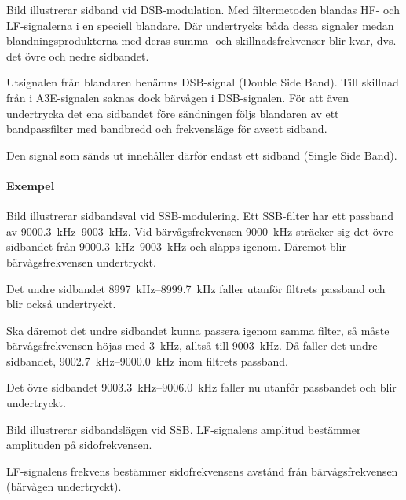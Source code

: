 Bild  illustrerar sidband vid DSB-modulation.
Med filtermetoden blandas HF- och LF-signalerna i en speciell blandare.
Där undertrycks båda dessa signaler medan blandningsprodukterna med deras summa-
och skillnadsfrekvenser blir kvar, dvs. det övre och nedre sidbandet.

Utsignalen från blandaren benämns DSB-signal (Double Side Band).
Till skillnad från i A3E-signalen saknas dock bärvågen i DSB-signalen.
För att även undertrycka det ena sidbandet före sändningen följs blandaren
av ett bandpassfilter med bandbredd och frekvensläge för avsett sidband.

Den signal som sänds ut innehåller därför endast ett sidband (Single Side Band).

\newpage

\paragraph{Exempel}


Bild  illustrerar sidbandsval vid SSB-modulering.
Ett SSB-filter har ett passband av \SIrange{9000,3}{9003}{\kilo\hertz}.
Vid bärvågsfrekvensen \qty{9000}{\kilo\hertz} sträcker sig det övre sidbandet
från \SIrange{9000,3}{9003}{\kilo\hertz} och släpps igenom.
Däremot blir bärvågsfrekvensen undertryckt.

Det undre sidbandet \SIrange{8997}{8999,7}{\kilo\hertz} faller utanför filtrets
passband och blir också undertryckt.

Ska däremot det undre sidbandet kunna passera igenom samma filter, så måste
bärvågsfrekvensen höjas med \qty{3}{\kilo\hertz}, alltså till
\qty{9003}{\kilo\hertz}.
Då faller det undre sidbandet, \SIrange{9002,7}{9000,0}{\kilo\hertz} inom
filtrets passband.

Det övre sidbandet \SIrange{9003,3}{9006,0}{\kilo\hertz} faller nu utanför
passbandet och blir undertryckt.


Bild  illustrerar sidbandslägen vid SSB.
LF-signalens amplitud bestämmer amplituden på sidofrekvensen.

LF-signalens frekvens bestämmer sidofrekvensens avstånd från bärvågsfrekvensen
(bärvågen undertryckt).

